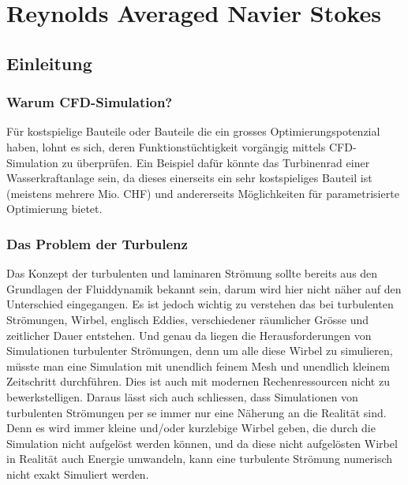 %
%
%
%
\chapter{Reynolds Averaged Navier Stokes \label{chapter:reynolds}}
\begin{refsection}

\section{Einleitung}

\subsection{Warum CFD-Simulation?}

Für kostspielige Bauteile oder Bauteile die ein grosses Optimierungspotenzial haben,
lohnt es sich, deren Funktionstüchtigkeit vorgängig mittels CFD-Simulation zu überprüfen.
Ein Beispiel dafür könnte das Turbinenrad einer Wasserkraftanlage sein,
da dieses einerseits ein sehr kostspieliges Bauteil ist (meistens mehrere Mio. CHF)
und andererseits Möglichkeiten für parametrisierte Optimierung bietet.

\subsection{Das Problem der Turbulenz}

Das Konzept der turbulenten und laminaren Strömung sollte bereits aus den Grundlagen der Fluiddynamik bekannt sein,
darum wird hier nicht näher auf den Unterschied eingegangen.
Es ist jedoch wichtig zu verstehen das bei turbulenten Strömungen, Wirbel, englisch Eddies, verschiedener räumlicher Grösse
und zeitlicher Dauer entstehen.
Und genau da liegen die Herausforderungen von Simulationen turbulenter Strömungen,
denn um alle diese Wirbel zu simulieren, müsste man eine Simulation mit unendlich feinem Mesh und unendlich kleinem Zeitschritt durchführen.
Dies ist auch mit modernen Rechenressourcen nicht zu bewerkstelligen.
Daraus lässt sich auch schliessen, dass Simulationen von turbulenten Strömungen per se immer nur eine Näherung an die Realität sind.
Denn es wird immer kleine und/oder kurzlebige Wirbel geben, die durch die Simulation nicht aufgelöst werden können,
und da diese nicht aufgelösten Wirbel in Realität auch Energie umwandeln, kann eine turbulente Strömung numerisch nicht exakt Simuliert werden.



\end{refsection}
